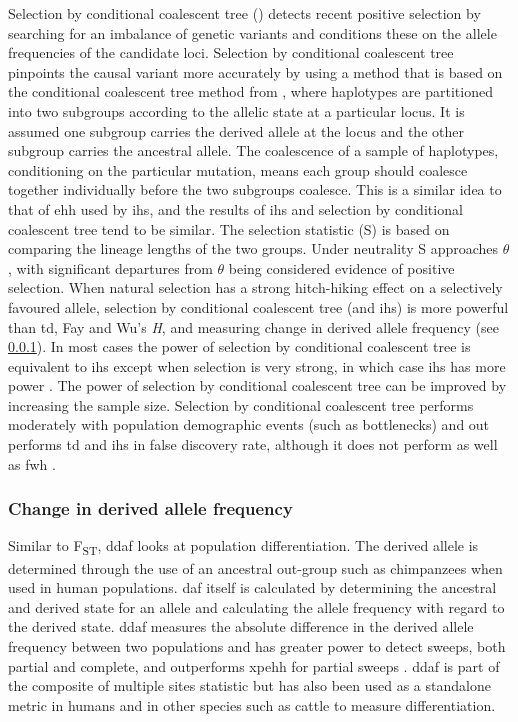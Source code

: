 \documentclass[twoside,openright]{report}
\begin{document}
Selection by conditional coalescent tree (\citet{Wang2014}) detects
recent positive selection by searching for an imbalance of genetic
variants and conditions these on the allele frequencies of the candidate
loci. Selection by conditional coalescent tree pinpoints the causal
variant more accurately by using a method that is based on the
conditional coalescent tree method from \citet{Wiuf1999}, where
haplotypes are partitioned into two subgroups according to the allelic
state at a particular locus. It is assumed one subgroup carries the
derived allele at the locus and the other subgroup carries the ancestral
allele. The coalescence of a sample of haplotypes, conditioning on the
particular mutation, means each group should coalesce together
individually before the two subgroups coalesce. This is a similar idea
to that of \gls{ehh} used by \gls{ihs}, and the results of \gls{ihs} and
selection by conditional coalescent tree tend to be similar. The
selection statistic (S) is based on comparing the lineage lengths of the
two groups. Under neutrality S approaches \(\theta\), with significant
departures from \(\theta\) being considered evidence of positive
selection. When natural selection has a strong hitch-hiking effect on a
selectively favoured allele, selection by conditional coalescent tree
(and \gls{ihs}) is more powerful than \gls{td}, Fay and Wu's \emph{H},
and measuring change in derived allele frequency (see \ref{dafsection}).
In most cases the power of selection by conditional coalescent tree is
equivalent to \gls{ihs} except when selection is very strong, in which
case \gls{ihs} has more power \citep{Wang2014}. The power of selection
by conditional coalescent tree can be improved by increasing the sample
size. Selection by conditional coalescent tree performs moderately with
population demographic events (such as bottlenecks) and out performs
\gls{td} and \gls{ihs} in false discovery rate, although it does not
perform as well as \gls{fwh} \citep{Wang2014}.

\subsubsection{Change in derived allele frequency}\label{dafsection}

Similar to F\textsubscript{ST}, \gls{ddaf} looks at population
differentiation. The derived allele is determined through the use of an
ancestral out-group such as chimpanzees when used in human populations.
\Gls{daf} itself is calculated by determining the ancestral and derived
state for an allele and calculating the allele frequency with regard to
the derived state. \gls{ddaf} measures the absolute difference in the
derived allele frequency between two populations \citep{Grossman2010}
and has greater power to detect sweeps, both partial and complete, and
outperforms \gls{xpehh} for partial sweeps \citep{Colonna2014}.
\gls{ddaf} is part of the composite of multiple sites statistic
\citep{Grossman2010} but has also been used as a standalone metric in
humans \citep{Colonna2014, Gudbjartsson2015} and in other species such
as cattle \citep{Randhawa2014} to measure differentiation.
\end{document}
